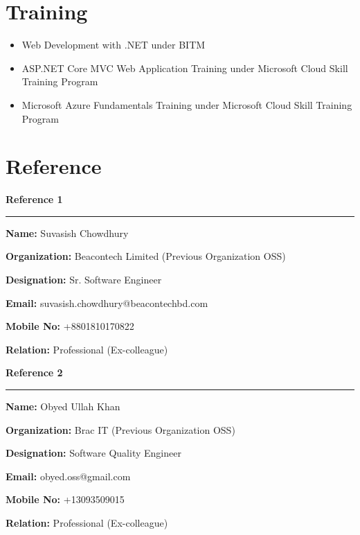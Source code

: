 \documentclass[a4paper,10pt]{article}
\newcommand{\cvref}[6]{%
  \noindent\textbf{#1}\par
  \vspace{0.2em}\noindent\textcolor{rulegray}{\rule{\linewidth}{1pt}}\par
  \vspace{0.5em}%
  \color{bodygray}%
  \textbf{Name:} #2\par\vspace{0.25em}
  \textbf{Organization:} #3\par\vspace{0.25em}
  \textbf{Designation:} #4\par\vspace{0.25em}
  \textbf{Email:} #5\par\vspace{0.25em}
  \textbf{Mobile No:} #6\par\vspace{0.25em}
  \textbf{Relation:} Professional (Ex-colleague)\par
}
\begin{document}
\section{Training}

\begin{itemize}
  \item Web Development with .NET under BITM
  \item ASP.NET Core MVC Web Application Training under Microsoft Cloud Skill Training Program
  \item Microsoft Azure Fundamentals Training under Microsoft Cloud Skill Training Program
\end{itemize}

%
%

\section{Reference}

\noindent
\begin{minipage}[t]{0.47\linewidth}
  \cvref{Reference 1}
        {Suvasish Chowdhury}
        {Beacontech Limited (Previous Organization OSS)}
        {Sr. Software Engineer}
        {suvasish.chowdhury@beacontechbd.com}
        {+8801810170822}
\end{minipage}%
\hfill
\begin{minipage}[t]{0.47\linewidth}
  \cvref{Reference 2}
        {Obyed Ullah Khan}
        {Brac IT (Previous Organization OSS)}
        {Software Quality Engineer}
        {obyed.oss@gmail.com}
        {+13093509015}
\end{minipage}
\end{document}
